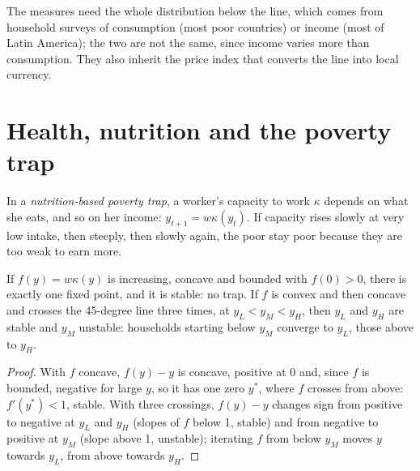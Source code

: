 \begin{measure}
The measures need the whole distribution below the line, which comes from household
surveys of consumption (most poor countries) or income (most of Latin America); the
two are not the same, since income varies more than consumption. They also inherit
the price index that converts the line into local currency.
\end{measure}

\section{Health, nutrition and the poverty trap}\label{sec:b3:development-microeconomics:health}

\begin{definition}\label{def:b3:development-microeconomics:poverty-trap}
In a \emph{nutrition-based poverty trap}, a worker's capacity to work $\kappa$ depends on
what she eats, and so on her income: $y_{t+1} = w\kappa(y_t)$. If capacity rises slowly at very low intake, then
steeply, then slowly again, the poor stay poor because they are too weak to earn more.
\end{definition}

\begin{proposition}\label{prop:b3:development-microeconomics:trap}
If $f(y) = w\kappa(y)$ is increasing, concave and bounded with $f(0) > 0$, there is exactly one fixed point, and it is
stable: no trap. If $f$ is convex and then concave and crosses the 45-degree line three times, at $y_L < y_M < y_H$,
then $y_L$ and $y_H$ are stable and $y_M$ unstable: households starting below $y_M$ converge to $y_L$, those
above to $y_H$.
\end{proposition}

\begin{proof}
With $f$ concave, $f(y) - y$ is concave, positive at 0 and, since $f$ is bounded, negative for large $y$, so it
has one zero $y^*$, where $f$ crosses from above: $f'(y^*) < 1$, stable. With three crossings, $f(y) - y$ changes sign
from positive to negative at $y_L$ and $y_H$ (slopes of $f$ below 1, stable) and from negative to positive at $y_M$
(slope above 1, unstable); iterating $f$ from below $y_M$ moves $y$ towards $y_L$, from above towards $y_H$.
\end{proof}

